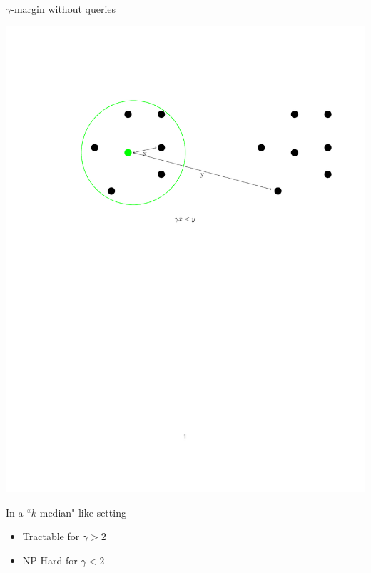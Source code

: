 \documentclass{beamer}
\begin{document}
\begin{frame}{$\gamma$-margin without queries}

    \begin{center}        
	    \includegraphics[trim=500 470 500 190,scale=0.5]{figures/gammaMargin.pdf}
    \end{center} 
  
  \vspace{0.5cm}In a ``$k$-median" like setting
  \begin{itemize}
    \vspace{0.3cm}\item {\color{blue} Tractable} for $\gamma > 2$
    \vspace{0.3cm}\item \alert{NP-Hard} for $\gamma < 2$
    \end{itemize}
\end{frame}
\end{document}
